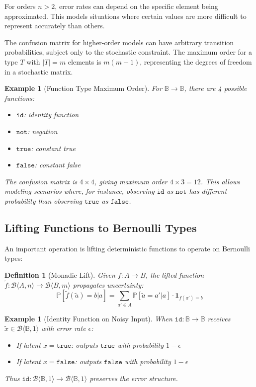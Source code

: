 \documentclass[11pt,final,hidelinks]{article}
\newtheorem{definition}[theorem]{Definition}
\newtheorem{example}[theorem]{Example}
\newcommand{\bernoulli}[2]{\mathcal{B}\langle #1, #2 \rangle}
\newcommand{\Bool}{\mathbb{B}}
\newcommand{\True}{\mathtt{true}}
\newcommand{\False}{\mathtt{false}}
\newcommand{\Prob}[1]{\mathbb{P}\left[#1\right]}
\begin{document}
For orders $n > 2$, error rates can depend on the specific element being approximated. This models situations where certain values are more difficult to represent accurately than others.

The confusion matrix for higher-order models can have arbitrary transition probabilities, subject only to the stochastic constraint. The maximum order for a type $T$ with $|T| = m$ elements is $m(m-1)$, representing the degrees of freedom in a stochastic matrix.

\begin{example}[Function Type Maximum Order]
For $\Bool \to \Bool$, there are 4 possible functions:
\begin{itemize}
    \item $\mathtt{id}$: identity function  
    \item $\mathtt{not}$: negation
    \item $\mathtt{true}$: constant true
    \item $\mathtt{false}$: constant false
\end{itemize}
The confusion matrix is $4 \times 4$, giving maximum order $4 \times 3 = 12$. This allows modeling scenarios where, for instance, observing $\mathtt{id}$ as $\mathtt{not}$ has different probability than observing $\mathtt{true}$ as $\mathtt{false}$.
\end{example}

\subsection{Lifting Functions to Bernoulli Types}

An important operation is lifting deterministic functions to operate on Bernoulli types:

\begin{definition}[Monadic Lift]
Given $f: A \to B$, the lifted function $\tilde{f}: \bernoulli{A}{n} \to \bernoulli{B}{m}$ propagates uncertainty:
\begin{equation}
\Prob{\tilde{f}(\tilde{a}) = b | a} = \sum_{a' \in A} \Prob{\tilde{a} = a' | a} \cdot \mathbf{1}_{f(a') = b}
\end{equation}
\end{definition}

\begin{example}[Identity Function on Noisy Input]
When $\mathtt{id}: \Bool \to \Bool$ receives $\tilde{x} \in \bernoulli{\Bool}{1}$ with error rate $\epsilon$:
\begin{itemize}
    \item If latent $x = \True$: outputs $\True$ with probability $1-\epsilon$
    \item If latent $x = \False$: outputs $\False$ with probability $1-\epsilon$
\end{itemize}
Thus $\mathtt{id}: \bernoulli{\Bool}{1} \to \bernoulli{\Bool}{1}$ preserves the error structure.
\end{example}
\end{document}
